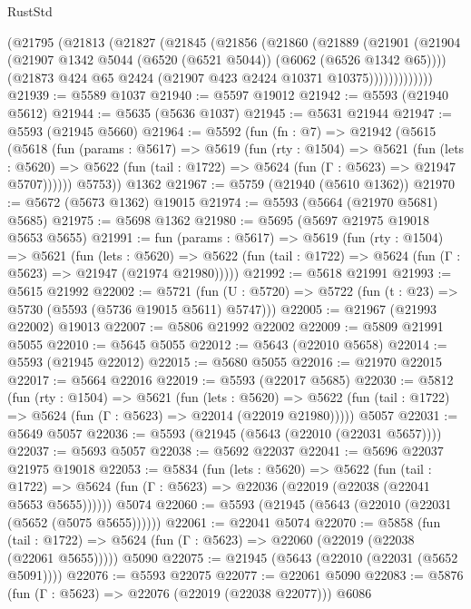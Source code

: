 \begin{lexlean}{RustStd}
\begin{coremodule}
          (@21795
            (@21813
              (@21827
                (@21845
                  (@21856
                    (@21860
                      (@21889
                        (@21901
                          (@21904
                            (@21907 @1342 @5044 (@6520 (@6521 @5044)) (@6062 (@6526 @1342 @65))))
                          (@21873 @424 @65 @2424 (@21907 @423 @2424 @10371 @10375)))))))))))))
@21939 := @5589 @1037
@21940 := @5597 @19012
@21942 := @5593 (@21940 @5612)
@21944 := @5635 (@5636 @1037)
@21945 := @5631 @21944
@21947 := @5593 (@21945 @5660)
@21964 := @5592
    (fun (fn : @7) =>
    @21942
      (@5615
        (@5618
          (fun (params : @5617) =>
          @5619
            (fun (rty : @1504) =>
            @5621
              (fun (lets : @5620) =>
              @5622 (fun (tail : @1722) => @5624 (fun (Γ : @5623) => @21947 @5707))))))
        @5753))
    @1362
@21967 := @5759 (@21940 (@5610 @1362))
@21970 := @5672 (@5673 @1362) @19015
@21974 := @5593 (@5664 (@21970 @5681) @5685)
@21975 := @5698 @1362
@21980 := @5695 (@5697 @21975 @19018 @5653 @5655)
@21991 := fun (params : @5617) =>
  @5619
    (fun (rty : @1504) =>
    @5621
      (fun (lets : @5620) =>
      @5622 (fun (tail : @1722) => @5624 (fun (Γ : @5623) => @21947 (@21974 @21980)))))
@21992 := @5618 @21991
@21993 := @5615 @21992
@22002 := @5721
    (fun (U : @5720) => @5722 (fun (t : @23) => @5730 (@5593 (@5736 @19015 @5611) @5747)))
@22005 := @21967 (@21993 @22002) @19013
@22007 := @5806 @21992 @22002
@22009 := @5809 @21991 @5055
@22010 := @5645 @5055
@22012 := @5643 (@22010 @5658)
@22014 := @5593 (@21945 @22012)
@22015 := @5680 @5055
@22016 := @21970 @22015
@22017 := @5664 @22016
@22019 := @5593 (@22017 @5685)
@22030 := @5812
    (fun (rty : @1504) =>
    @5621
      (fun (lets : @5620) =>
      @5622 (fun (tail : @1722) => @5624 (fun (Γ : @5623) => @22014 (@22019 @21980)))))
    @5057
@22031 := @5649 @5057
@22036 := @5593 (@21945 (@5643 (@22010 (@22031 @5657))))
@22037 := @5693 @5057
@22038 := @5692 @22037
@22041 := @5696 @22037 @21975 @19018
@22053 := @5834
    (fun (lets : @5620) =>
    @5622
      (fun (tail : @1722) =>
      @5624 (fun (Γ : @5623) => @22036 (@22019 (@22038 (@22041 @5653 @5655))))))
    @5074
@22060 := @5593 (@21945 (@5643 (@22010 (@22031 (@5652 (@5075 @5655))))))
@22061 := @22041 @5074
@22070 := @5858
    (fun (tail : @1722) => @5624 (fun (Γ : @5623) => @22060 (@22019 (@22038 (@22061 @5655)))))
    @5090
@22075 := @21945 (@5643 (@22010 (@22031 (@5652 @5091))))
@22076 := @5593 @22075
@22077 := @22061 @5090
@22083 := @5876 (fun (Γ : @5623) => @22076 (@22019 (@22038 @22077))) @6086

\end{coremodule}
\end{lexlean}
